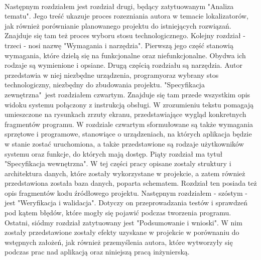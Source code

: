 \paragraph{}
Następnym rozdziałem jest rozdział drugi, będący zatytuowanym "Analiza tematu". Jego treść ukazuje proces rozezniania autora w temacie lokalizatorów, jak również porównianie planowanego projektu do istniejących rozwiązań. Znajduje się tam też proces wyboru stosu technologicznego. Kolejny rozdział - trzeci - nosi nazwę "Wymagania i narzędzia". Pierwszą jego część stanowią wymagania, które dzielą się na funkcjonalne oraz niefunkcjonalne. Obydwa ich rodzaje są wymienione i opsiane. Drugą częścią rozdziału są narzędzia. Autor przedstawia w niej niezbędne urządzenia, programyoraz wybrany stos technologiczny, niezbędny do zbudowania projektu. "Specyfikacja zewnętrzna"\ jest rozdziałem czwartym. Znajduje się tam przede wszystkim opis widoku systemu połączony z instrukcją obsługi. W zrozumieniu tekstu pomagają umieszczone na rysunkach zrzuty ekranu, przedstawiające wygląd konkretnych fragmentów programu. W rozdziale czwartym sformułowane są także wymagania sprzętowe i programowe, stanowiące o urządzeniach, na których aplikacja będzie w stanie zostać uruchomiona, a także przedstawione są rodzaje użytkowników systemu oraz funkcje, do których mają dostęp. Piąty rozdział ma tytuł "Specyfikacja wewnętrzna". W tej części pracy opisane zostaly struktury i architektura danych, które zostały wykorzystane w projekcie, a zatem również przedstawiona została baza danych, poparta schematem. Rozdział ten posiada też opis fragmentów kodu źródłowego projektu. Następnym rozdziałem - szóstym - jest "Weryfikacja i walidacja". Dotyczy on przeprowadzania testów i sprawdzeń pod kątem błędów, które mogły się pojawić podczas tworzenia programu. Ostatni, siódmy rozdział zatytuowany jest "Podsumowanie i wnioski". W nim zostały przedstawione zostały efekty uzyskane w projekcie w porównaniu do wstępnych założeń, jak również przemyślenia autora, które wytworzyły się podczas prac nad aplikacją oraz niniejszą pracą inżynierską.   